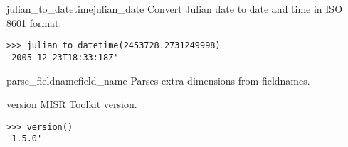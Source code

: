 \documentclass{howto}
\begin{document}
\begin{funcdesc}{julian_to_datetime}{julian_date}
    Convert Julian date to date and time in ISO 8601 format.

\begin{verbatim}
>>> julian_to_datetime(2453728.2731249998)
'2005-12-23T18:33:18Z'
\end{verbatim}
\end{funcdesc}

\begin{funcdesc}{parse_fieldname}{field_name}
    Parses extra dimensions from fieldnames.
\end{funcdesc}

\begin{funcdesc}{version}{}
    MISR Toolkit version.

\begin{verbatim}
>>> version()
'1.5.0'
\end{verbatim}
\end{funcdesc}
\end{document}
